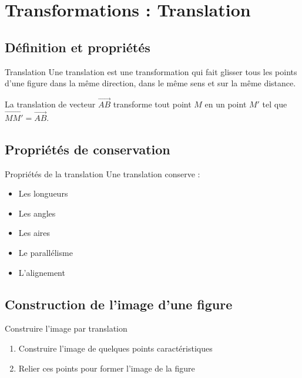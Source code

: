 \chapter{Transformations : Translation}

\section{Définition et propriétés}
\begin{definition}{Translation}
Une translation est une transformation qui fait glisser tous les points d'une figure dans la même direction, dans le même sens et sur la même distance.
\end{definition}

\begin{exemple}
La translation de vecteur $\vec{AB}$ transforme tout point $M$ en un point $M'$ tel que $\vec{MM'} = \vec{AB}$.
\end{exemple}

\section{Propriétés de conservation}
\begin{propriete}{Propriétés de la translation}
Une translation conserve :
\begin{itemize}
    \item Les longueurs
    \item Les angles
    \item Les aires
    \item Le parallélisme
    \item L'alignement
\end{itemize}
\end{propriete}

\section{Construction de l'image d'une figure}
\begin{methode}{Construire l'image par translation}
\begin{enumerate}
    \item Construire l'image de quelques points caractéristiques
    \item Relier ces points pour former l'image de la figure
\end{enumerate}
\end{methode} 
